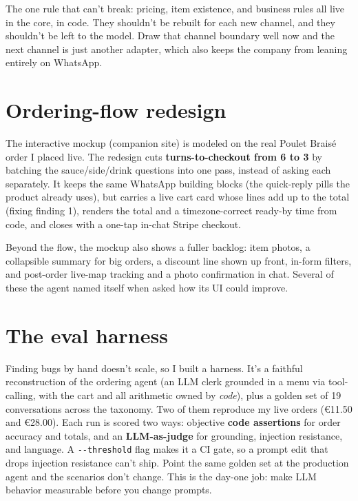 \documentclass[11pt]{article}
\begin{document}
The one rule that can't break: pricing, item existence, and business rules all live in the core, in
code. They shouldn't be rebuilt for each new channel, and they shouldn't be left to the model. Draw
that channel boundary well now and the next channel is just another adapter, which also keeps the
company from leaning entirely on WhatsApp.

\section{Ordering-flow redesign}

The interactive mockup (companion site) is modeled on the real Poulet Brais\'e order I placed live.
The redesign cuts \textbf{turns-to-checkout from 6 to 3} by batching the sauce/side/drink questions
into one pass, instead of asking each separately. It keeps the same WhatsApp building blocks (the
quick-reply pills the product already uses), but carries a live cart card whose lines add up to the
total (fixing finding 1), renders the total and a timezone-correct ready-by time from code, and
closes with a one-tap in-chat Stripe checkout.

Beyond the flow, the mockup also shows a fuller backlog: item photos, a collapsible summary for big
orders, a discount line shown up front, in-form filters, and post-order live-map tracking and a
photo confirmation in chat. Several of these the agent named itself when asked how its UI could
improve.

\section{The eval harness}

Finding bugs by hand doesn't scale, so I built a harness. It's a faithful reconstruction of the
ordering agent (an LLM clerk grounded in a menu via tool-calling, with the cart and all arithmetic
owned by \emph{code}), plus a golden set of 19 conversations across the taxonomy. Two of them
reproduce my live orders (\euro{}11.50 and \euro{}28.00). Each run is scored two ways: objective
\textbf{code assertions} for order accuracy and totals, and an \textbf{LLM-as-judge} for grounding,
injection resistance, and language. A \texttt{-{}-threshold} flag makes it a CI gate, so a prompt
edit that drops injection resistance can't ship. Point the same golden set at the production agent
and the scenarios don't change. This is the day-one job: make LLM behavior measurable before you
change prompts.
\end{document}
